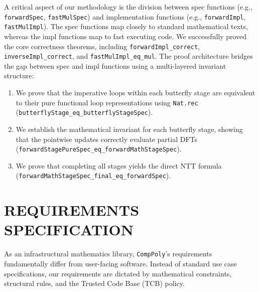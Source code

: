 \documentclass[a4paper,12pt]{report}
\begin{document}
A critical aspect of our methodology is the division between spec functions (e.g., \allowbreak\texttt{forwardSpec}, \allowbreak\texttt{fastMulSpec}) and implementation functions (e.g., \allowbreak\texttt{forwardImpl}, \allowbreak\texttt{fastMulImpl}). The spec functions map closely to standard mathematical texts, whereas the impl functions map to fast executing code. We successfully proved the core correctness theorems, including \texttt{forward}\allowbreak\texttt{Impl\_}\allowbreak\texttt{correct}, \allowbreak\texttt{inverse}\allowbreak\texttt{Impl\_}\allowbreak\texttt{correct}, and \allowbreak\texttt{fastMul}\allowbreak\texttt{Impl\_}\allowbreak\texttt{eq\_}\allowbreak\texttt{mul}. The proof architecture bridges the gap between spec and impl functions using a multi-layered invariant structure:
\begin{enumerate}
    \item We prove that the imperative loops within each butterfly stage are equivalent to their pure functional loop representations using \texttt{Nat.rec} (\texttt{butterfly}\allowbreak\texttt{Stage\_}\allowbreak\texttt{eq\_}\allowbreak\texttt{butterfly}\allowbreak\texttt{Stage}\allowbreak\texttt{Spec}).
    \item We establish the mathematical invariant for each butterfly stage, showing that the pointwise updates correctly evaluate partial DFTs (\texttt{forward}\allowbreak\texttt{Stage}\allowbreak\texttt{Pure}\allowbreak\texttt{Spec}\allowbreak\texttt{\_eq\_}\allowbreak\texttt{forward}\allowbreak\texttt{Math}\allowbreak\texttt{Stage}\allowbreak\texttt{Spec}).
    \item We prove that completing all stages yields the direct NTT formula (\texttt{forward}\allowbreak\texttt{Math}\allowbreak\texttt{Stage}\allowbreak\texttt{Spec\_}\allowbreak\texttt{final\_}\allowbreak\texttt{eq\_}\allowbreak\texttt{forward}\allowbreak\texttt{Spec}).
\end{enumerate}
\newpage

\chapter{REQUIREMENTS SPECIFICATION}
As an infrastructural mathematics library, \texttt{CompPoly}'s requirements fundamentally differ from user-facing software. Instead of standard use case specifications, our requirements are dictated by mathematical constraints, structural rules, and the Trusted Code Base (TCB) policy.
\end{document}
